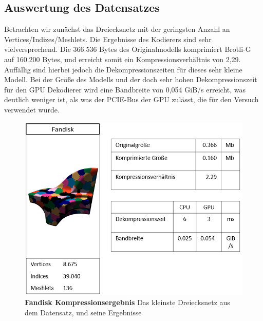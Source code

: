 \subsection{Auswertung des Datensatzes}
\label{subsec:auswertung1}
Betrachten wir zunächst das Dreiecksnetz mit der geringsten Anzahl an Vertices/Indizes/Meshlets. 
Die Ergebnisse des Kodierers sind sehr vielversprechend. 
Die 366.536 Bytes des Originalmodells komprimiert Brotli-G auf 160.200 Bytes, und erreicht somit ein Kompressionsverhältnis von 2,29.
Auffällig sind hierbei jedoch die Dekompressionszeiten für dieses sehr kleine Modell. 
Bei der Größe des Modells und der doch sehr hohen Dekompressionszeit für den GPU Dekodierer wird eine Bandbreite von 0,054 GiB/s erreicht, was deutlich weniger ist, als was der PCIE-Bus der GPU zulässt, die für den Versuch verwendet wurde.

\begin{figure}[htb]
  \centering  
  \includegraphics[scale=0.7]{Bilder/fandisk_ergebniss.png}
  \caption[Fandisk Kompressionsergebnis]{\textbf{Fandisk Kompressionsergebnis} Das kleinste Dreiecksnetz aus dem Datensatz, und seine Ergebnisse}
  \label{fig:mesh_shading_pipeline}
\end{figure}

